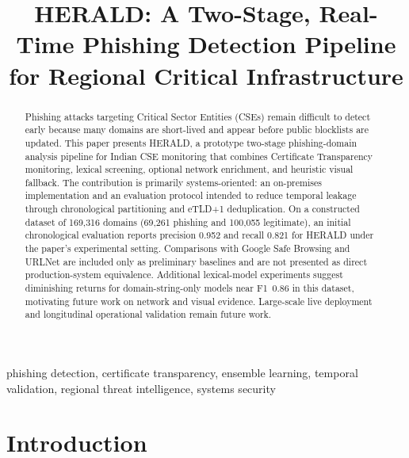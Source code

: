 \documentclass[conference]{IEEEtran}
\begin{document}
\title{HERALD: A Two-Stage, Real-Time Phishing Detection Pipeline for Regional Critical Infrastructure}

\author{
}

\maketitle

\begin{abstract}
Phishing attacks targeting Critical Sector Entities (CSEs) remain difficult to detect early because many domains are short-lived and appear before public blocklists are updated. This paper presents HERALD, a prototype two-stage phishing-domain analysis pipeline for Indian CSE monitoring that combines Certificate Transparency monitoring, lexical screening, optional network enrichment, and heuristic visual fallback. The contribution is primarily systems-oriented: an on-premises implementation and an evaluation protocol intended to reduce temporal leakage through chronological partitioning and eTLD+1 deduplication. On a constructed dataset of 169,316 domains (69,261 phishing and 100,055 legitimate), an initial chronological evaluation reports precision 0.952 and recall 0.821 for HERALD under the paper's experimental setting. Comparisons with Google Safe Browsing and URLNet are included only as preliminary baselines and are not presented as direct production-system equivalence. Additional lexical-model experiments suggest diminishing returns for domain-string-only models near F1~0.86 in this dataset, motivating future work on network and visual evidence. Large-scale live deployment and longitudinal operational validation remain future work.
\end{abstract}

\begin{IEEEkeywords}
phishing detection, certificate transparency, ensemble learning, temporal validation, regional threat intelligence, systems security
\end{IEEEkeywords}

\section{Introduction}
\end{document}
